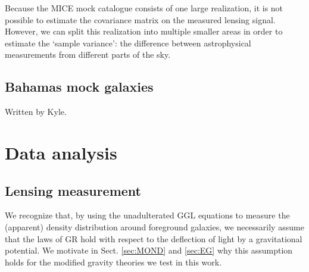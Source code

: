 \documentclass[usenatbib]{mnras}
\begin{document}
Because the MICE mock catalogue consists of one large realization, it is not possible to estimate the covariance matrix on the measured lensing signal. However, we can split this realization into multiple smaller areas in order to estimate the `sample variance': the difference between astrophysical measurements from different parts of the sky.




\subsection{Bahamas mock galaxies}
\label{sec:bahamas_mocks}
Written by Kyle.

\section{Data analysis}
\label{sec:analysis}

\subsection{Lensing measurement}
\label{sec:lensing}

We recognize that, by using the unadulterated GGL equations to measure the (apparent) density distribution around foreground galaxies, we necessarily assume that the laws of GR hold with respect to the deflection of light by a gravitational potential. We motivate in Sect. \ref{sec:MOND} and \ref{sec:EG} why this assumption holds for the modified gravity theories we test in this work. 
\end{document}
